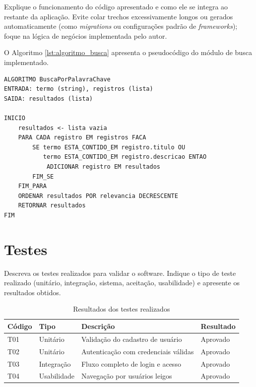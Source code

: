 Explique o funcionamento do código apresentado e como ele se integra ao restante da aplicação. Evite colar trechos excessivamente longos ou gerados automaticamente (como \textit{migrations} ou configurações padrão de \textit{frameworks}); foque na lógica de negócios implementada pelo autor.

O Algoritmo \ref{lst:algoritmo_busca} apresenta o pseudocódigo do módulo de busca implementado.

\begin{lstlisting}[caption={Algoritmo de busca por palavra-chave}, label={lst:algoritmo_busca}, language={}]
ALGORITMO BuscaPorPalavraChave
ENTRADA: termo (string), registros (lista)
SAIDA: resultados (lista)

INICIO
    resultados <- lista vazia
    PARA CADA registro EM registros FACA
        SE termo ESTA_CONTIDO_EM registro.titulo OU
           termo ESTA_CONTIDO_EM registro.descricao ENTAO
            ADICIONAR registro EM resultados
        FIM_SE
    FIM_PARA
    ORDENAR resultados POR relevancia DECRESCENTE
    RETORNAR resultados
FIM
\end{lstlisting}

\section{Testes}

Descreva os testes realizados para validar o software. Indique o tipo de teste realizado (unitário, integração, sistema, aceitação, usabilidade) e apresente os resultados obtidos.

\begin{table}[htb]
\centering
\caption{Resultados dos testes realizados}
\label{tab:testes}
\begin{tabular}{@{}llll@{}}
\toprule
\textbf{Código} & \textbf{Tipo} & \textbf{Descrição} & \textbf{Resultado} \\ \midrule
T01 & Unitário & Validação do cadastro de usuário & Aprovado \\
T02 & Unitário & Autenticação com credenciais válidas & Aprovado \\
T03 & Integração & Fluxo completo de login e acesso & Aprovado \\
T04 & Usabilidade & Navegação por usuários leigos & Aprovado \\ \bottomrule
\end{tabular}
\end{table}
